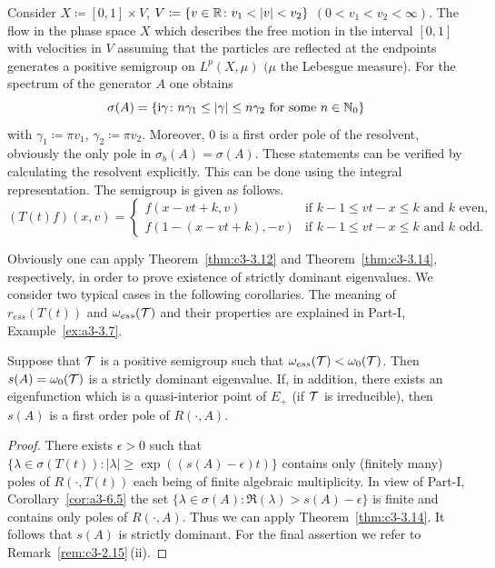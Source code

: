 \begin{example}\label{ex:c3-3.15}
	Consider $X \coloneq  [0,1] \times V$, $V \coloneq  \{v \in \mathbb{R}  \colon v_{1} < |v| < v_{2}\}$ $(0 < v_{1} < v_{2} < \infty)$. 
	The flow in the phase space $X$ which describes the free motion in the interval $[0,1]$ with velocities in $V$ assuming that the particles are reflected at the endpoints generates a positive semigroup on $L^{p}(X,\mu)$ $(\mu$ the Lebesgue measure). 
	For the spectrum of the generator $A$ one obtains 
    \[
    \sigma(A) = \{\im \gamma \colon n\gamma_{1} \leq |\gamma| \leq n\gamma_{2} \text{ for some } n \in \N_{0}\}
    \]
    with $\gamma_{1} \coloneq \pi v_{1}$, $\gamma_{2} \coloneq \pi v_{2}$. 
	Moreover, $0$ is a first order pole of the resolvent, obviously the only pole in $\sigma_{b}(A) = \sigma(A)$.
	These statements can be verified by calculating the resolvent explicitly. 
	This can be done using the integral representation. 
    The semigroup is given as follows.
\begin{equation}\label{eq:c3-3.20}
	(T(t)f)(x,v) = \begin{cases}
		f(x-vt+k,v) & \text{if } k-1\leq vt-x\leq k \text{ and } k \text{ even}, \\
		f(1-(x-vt+k),-v) & \text{if } k-1\leq vt-x\leq k \text{ and } k \text{ odd}.
	\end{cases}
\end{equation} 

Obviously one can apply Theorem~\ref{thm:c3-3.12} and Theorem~\ref{thm:c3-3.14}, respectively, in order to prove existence of strictly dominant eigenvalues. 
We consider two typical cases in the following corollaries. 
The meaning of\/ $r_{ess}(T(t))$ and $\omega_{ess}(\mathcal{T})$ and their properties are explained in Part-I, Example~\ref{ex:a3-3.7}.
\end{example}
\begin{corollary}\label{cor:c3-3.16}
	Suppose that $\mathcal{T}$ is a positive semigroup such that $\omega_{ess}(\mathcal{T}) < \omega_0(\mathcal{T})$. 
	Then $s(A) = \omega_0(\mathcal{T})$ is a strictly dominant eigenvalue.
	If, in addition, there exists an eigenfunction which is a quasi-interior point of\/ $E_{+}$ (\eg if\/ $\mathcal{T}$ is irreducible), then $s(A)$ is a first order pole of\/ $R(\cdot,A)$.
\end{corollary}
\begin{proof}
	There exists $\epsilon > 0$ such that 
    $\{\lambda \in \sigma(T(t)) \colon |\lambda| \geq \exp((s(A)-\epsilon)t)\}$ contains only (finitely many) poles of\/ $R(\cdot,T(t))$ each being of finite algebraic multiplicity. 
	In view of Part-I, Corollary~\ref{cor:a3-6.5} the set $\{\lambda \in \sigma(A) \colon \Re(\lambda) > s(A)-\epsilon\}$ is finite and contains only poles of\/ $R(\cdot,A)$. 
	Thus we can apply Theorem~\ref{thm:c3-3.14}. 
	It follows that $s(A)$ is strictly dominant.
	For the final assertion we refer to Remark~\ref{rem:c3-2.15}\,(ii).
\end{proof}

